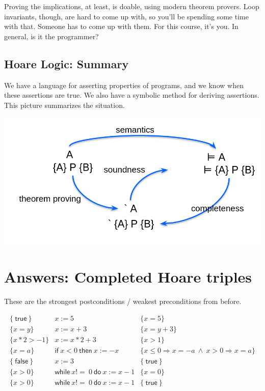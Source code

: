 \documentclass[11pt]{article}
\begin{document}
Proving the implications, at least, is doable, using modern theorem provers. Loop invariants, though, are hard to come up with, so you'll be spending some time with that. Someone has to come up with them. For this course, it's you. In general, is it the programmer?

\subsection*{Hoare Logic: Summary}
We have a language for asserting properties of programs, and we know when these assertions are true. We also have a symbolic method for deriving assertions. This picture summarizes the situation.

\includegraphics[width=\textwidth]{L12/everything.png}


\section*{Answers: Completed Hoare triples} These are the strongest postconditions / weakest preconditions from before.

\[
\begin{array}{lll}
  \{ \mathsf{~true~} \} & x := 5 &\{ x = 5 \} \\
  \{ x = y \} & x := x + 3 &\{ x = y + 3 \} \\
  \{ x * 2 > -1 \} & x := x * 2 + 3 &\{ x > 1 \} \\
  \{ x = a \} & \mathsf{if~} x < 0 \mathsf{~then~} x := -x  &\{ x \leq 0 \Rightarrow x = -a ~\wedge~ x > 0 \Rightarrow x = a \} \\
  \{ \mathsf{~false~} \} & x := 3  &\{ \mathsf{~true~} \} \\
  \{ x > 0 \} & \mathsf{while~} x \mathtt{!=~} 0 \mathsf{~do~} x := x - 1  &\{ x = 0 \} \\
  \{ x > 0 \} & \mathsf{while~} x \mathtt{!=~} 0 \mathsf{~do~} x := x - 1 & \{ \mathsf{~true~} \} \\
\end{array}
\]
\end{document}

